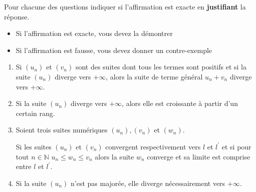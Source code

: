 
%
Pour chacune des questions indiquer si l'affirmation est exacte en \textbf{justifiant} la réponse.
\begin{itemize}
     \item
     Si l'affirmation est exacte, vous devez la démontrer
     \item
     Si l'affirmation est fausse, vous devez donner un contre-exemple
\end{itemize}
\begin{enumerate}
     \item
     Si $\left(u_{n}\right)$ et $\left(v_{n}\right)$ sont des suites dont tous les termes sont positifs et si la suite $\left(u_{n}\right)$ diverge vers $+\infty $, alors la suite de terme général $u_{n}+v_{n}$ diverge vers $+\infty $.
     \item
     Si la suite $\left(u_{n}\right)$ diverge vers $+\infty $, alors elle est croissante à partir d'un certain rang.
     \item
     Soient trois suites numériques $\left(u_{n}\right), \left(v_{n}\right)$ et $\left(w_{n}\right)$.
     \par
     Si les suites $\left(u_{n}\right)$ et $\left(v_{n}\right)$ convergent respectivement vers $l$ et $l^{\prime}$ et si pour tout $n \in  \mathbb{N}$ $u_{n} \leqslant  w_{n} \leqslant  v_{n}$ alors la suite $w_{n}$ converge et sa limite est comprise entre $l$ et $l^{\prime}$.
     \item
     Si la suite $\left(u_{n}\right)$ n'est pas majorée, elle diverge nécessairement vers $+\infty $.
\end{enumerate}
